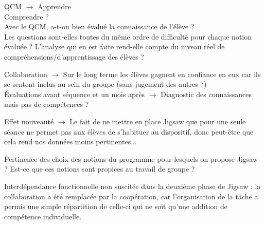 QCM $\rightarrow$ Apprendre\\
Comprendre ?\\
Avec le QCM, a-t-on bien évalué la connaissance de l'élève ?\\
Les questions sont-elles toutes du même ordre de difficulté pour chaque notion évaluée ? L'analyse qui en est faite rend-elle compte du niveau réel de compréhensions/d'apprentissage des élèves ?


Collaboration $\rightarrow$ Sur le long terme les élèves gagnent en confiance en eux car ils se sentent inclus au sein du groupe (sans jugement des autres ?)\\


Évaluations avant séquence et un mois après $\rightarrow$ Diagnostic des connaissances mais pas de compétences ?


Effet nouveauté $\rightarrow$ Le fait de ne mettre en place Jigsaw que pour une seule séance ne permet pas aux élèves de s'habituer au dispositif, donc peut-être que cela rend nos données moins pertinentes...

Pertinence des choix des notions du programme pour lesquels on propose Jigsaw ? Est-ce que ces notions sont propices au travail de groupe ?

Interdépendance fonctionnelle non suscitée dans la deuxième phase de Jigsaw : la collaboration a été remplacée par la coopération, car l'organisation de la tâche a permis une simple répartition de celle-ci qui ne soit qu'une addition de compétence individuelle.